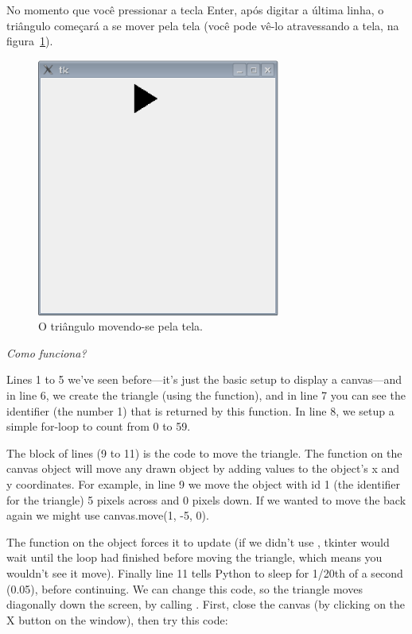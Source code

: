 No momento que você pressionar a tecla Enter, após digitar a última linha, o triângulo começará a se mover pela tela (você pode vê-lo atravessando a tela, na figura~\ref{fig44}).

\begin{figure}
\begin{center}
\includegraphics[width=80mm]{eps/figure44.eps}
\end{center}
\caption{O triângulo movendo-se pela tela.}\label{fig44}
\end{figure}

\par
\emph{Como funciona?}
\par
Lines 1 to 5 we've seen before---it's just the basic setup to display a canvas---and in line 6, we create the triangle (using the  function), and in line 7 you can see the identifier (the number 1) that is returned by this function. In line 8, we setup a simple for-loop to count from 0 to 59.

The block of lines (9 to 11) is the code to move the triangle. The  function on the canvas object will move any drawn object by adding values to the object's x and y coordinates. For example, in line 9 we move the object with id 1 (the identifier for the triangle) 5 pixels across and 0 pixels down. If we wanted to move the back again we might use canvas.move(1, -5, 0).
 
The function  on the  object forces it to update (if we didn't use , tkinter would wait until the loop had finished before moving the triangle, which means you wouldn't see it move). Finally line 11 tells Python to sleep for 1/20th of a second (0.05), before continuing. We can change this code, so the triangle moves diagonally down the screen, by calling .  First, close the canvas (by clicking on the X button on the window), then try this code:

